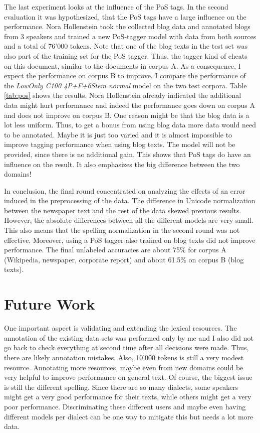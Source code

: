 \documentclass[11pt,letterpaper, covington]{article}
\begin{document}
The last experiment looks at the influence of the PoS tags. In the second evaluation it was hypothesized, that the PoS tags have a large influence on the performance. Nora Hollenstein took the collected blog data and annotated blogs from 3 speakers and trained a new PoS-tagger model with data from both sources and a total of 76'000 tokens. Note that one of the blog texts in the test set was also part of the training set for the PoS tagger. Thus, the tagger kind of cheats on this document, similar to the documents in corpus A. As a consequence, I expect the performance on corpus B to improve.
I compare the performance of the \emph{LowOnly C100 4P+F+6Stem normal} model on the two test corpora. Table \ref{tab:pos} shows the results.  Nora Hollenstein already indicated the additional data might hurt performance and indeed the performance goes down on corpus A and does not improve on corpus B. One reason might be that the blog data is a lot less uniform. Thus, to get a bonus from using blog data more data would need to be annotated. Maybe it is just too varied and it is almost impossible to improve tagging performance when using blog texts. The model will not be provided, since there is no additional gain. This shows that PoS tags do have an influence on the result. It also emphasizes the big difference between the two domains!

In conclusion, the final round concentrated on analyzing the effects of an error induced in the preprocessing of the data. The difference in Unicode normalization between the newspaper text and the rest of the data skewed previous results. However, the absolute differences between all the different models are very small. This also means that the spelling normalization in the second round was not effective. Moreover, using a PoS tagger also trained on blog texts did not improve performance. The final unlabeled accuracies are about 75\% for corpus A (Wikipedia, newspaper, corporate report) and about 61.5\% on corpus B (blog texts).

\section{Future Work}

One important aspect is validating and extending the lexical resources. The annotation of the existing data sets was performed only by me and I also did not go back to check everything at second time after all decisions were made. Thus, there are likely annotation mistakes. Also, 10'000 tokens is still a very modest resource. Annotating more resources, maybe even from new domains could be very helpful to improve performance on general text. Of course, the biggest issue is still the different spelling. Since there are so many dialects, some speakers might get a very good performance for their texts, while others might get a very poor performance. Discriminating these different users and maybe even having different models per dialect can be one way to mitigate this but needs a lot more data.
\end{document}
